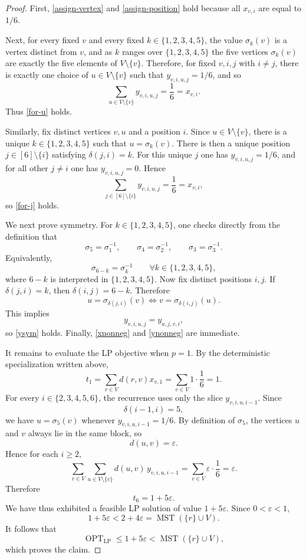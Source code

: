 \documentclass[11pt]{article}
\begin{document}
\begin{proof}
First, \eqref{assign-vertex} and \eqref{assign-position} hold because all $x_{v,i}$ are equal to $1/6$.

Next, for every fixed $v$ and every fixed $k\in\{1,2,3,4,5\}$, the value $\sigma_k(v)$ is a vertex distinct from $v$, and as $k$ ranges over $\{1,2,3,4,5\}$ the five vertices $\sigma_k(v)$ are exactly the five elements of $V\setminus\{v\}$. Therefore, for fixed $v,i,j$ with $i\neq j$, there is exactly one choice of $u\in V\setminus\{v\}$ such that $y_{v,i,u,j}=1/6$, and so
\[
\sum_{u\in V\setminus\{v\}} y_{v,i,u,j}=\frac16=x_{v,i}.
\]
Thus \eqref{for-u} holds.

Similarly, fix distinct vertices $v,u$ and a position $i$. Since $u\in V\setminus\{v\}$, there is a unique $k\in\{1,2,3,4,5\}$ such that $u=\sigma_k(v)$. There is then a unique position $j\in [6]\setminus\{i\}$ satisfying $\delta(j,i)=k$. For this unique $j$ one has $y_{v,i,u,j}=1/6$, and for all other $j\neq i$ one has $y_{v,i,u,j}=0$. Hence
\[
\sum_{j\in [6]\setminus\{i\}} y_{v,i,u,j}=\frac16=x_{v,i},
\]
so \eqref{for-j} holds.

We next prove symmetry. For $k\in\{1,2,3,4,5\}$, one checks directly from the definition that
\[
\sigma_5=\sigma_1^{-1},
\qquad
\sigma_4=\sigma_2^{-1},
\qquad
\sigma_3=\sigma_3^{-1}.
\]
Equivalently,
\[
\sigma_{6-k}=\sigma_k^{-1}
\qquad \forall k\in\{1,2,3,4,5\},
\]
where $6-k$ is interpreted in $\{1,2,3,4,5\}$. Now fix distinct positions $i,j$. If $\delta(j,i)=k$, then $\delta(i,j)=6-k$. Therefore
\[
u=\sigma_{\delta(j,i)}(v)
\iff
v=\sigma_{\delta(i,j)}(u).
\]
This implies
\[
y_{v,i,u,j}=y_{u,j,v,i},
\]
so \eqref{ysym} holds. Finally, \eqref{xnonneg} and \eqref{ynonneg} are immediate.

It remains to evaluate the LP objective when $p=1$. By the deterministic specialization written above,
\[
t_1=\sum_{v\in V} d(r,v)x_{v,1}=\sum_{v\in V} 1\cdot \frac16=1.
\]
For every $i\in\{2,3,4,5,6\}$, the recurrence uses only the slice $y_{v,i,u,i-1}$. Since
\[
\delta(i-1,i)=5,
\]
we have $u=\sigma_5(v)$ whenever $y_{v,i,u,i-1}=1/6$. By definition of $\sigma_5$, the vertices $u$ and $v$ always lie in the same block, so
\[
d(u,v)=\varepsilon.
\]
Hence for each $i\ge 2$,
\[
\sum_{v\in V}\sum_{u\in V\setminus\{v\}} d(u,v)\,y_{v,i,u,i-1}
=\sum_{v\in V} \varepsilon\cdot \frac16
=\varepsilon.
\]
Therefore
\[
t_6=1+5\varepsilon.
\]
We have thus exhibited a feasible LP solution of value $1+5\varepsilon$. Since $0<\varepsilon<1$,
\[
1+5\varepsilon < 2+4\varepsilon = \operatorname{MST}(\{r\}\cup V).
\]
It follows that
\[
\operatorname{OPT}_{\mathrm{LP}} \le 1+5\varepsilon < \operatorname{MST}(\{r\}\cup V),
\]
which proves the claim.
\end{proof}
\end{document}
